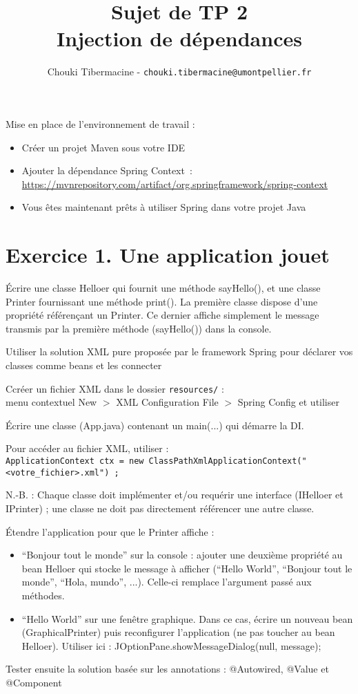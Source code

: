 \documentclass[11pt]{article}
\title{Sujet de TP 2\\
{\large Injection de dépendances}}
\author{Chouki Tibermacine - \texttt{chouki.tibermacine@umontpellier.fr}}
\date{}
\begin{document}
\maketitle

Mise en place de l'environnement de travail :

\begin{itemize}
  \item Créer un projet Maven sous votre IDE 
  \item Ajouter la dépendance Spring Context~:\\
  \url{https://mvnrepository.com/artifact/org.springframework/spring-context}
  \item Vous êtes maintenant prêts à utiliser Spring dans votre projet
    Java
\end{itemize}

\section*{Exercice 1. \small{Une application jouet}} 

Écrire une classe Helloer qui fournit une méthode sayHello(), et une
classe Printer fournissant une méthode print(). La première classe
dispose d'une propriété référençant un Printer. Ce dernier affiche
simplement le message transmis par la première méthode (sayHello())
dans la console.

Utiliser la solution XML pure proposée par le framework Spring pour
déclarer vos classes comme beans et les connecter

Ccréer un fichier XML dans le dossier \texttt{resources/} :\\
menu contextuel New $>$ XML Configuration File $>$ Spring Config et utiliser

Écrire une classe (App.java) contenant un main(...) qui démarre la DI.

Pour accéder au fichier XML, utiliser :\\
\texttt{ApplicationContext ctx = new ClassPathXmlApplicationContext("<votre\_fichier>.xml") ;}

N.-B. : Chaque classe doit implémenter et/ou requérir une interface
(IHelloer et IPrinter) ; une classe ne doit pas directement référencer
une autre classe.

Étendre l'application pour que le Printer affiche :
\begin{itemize}
\item ``Bonjour tout le monde'' sur la console : ajouter une deuxième
  propriété au bean Helloer qui stocke le message à afficher (``Hello
  World'', ``Bonjour tout le monde'', ``Hola, mundo'', ...). Celle-ci
  remplace l'argument passé aux méthodes.
\item ``Hello World'' sur une fenêtre graphique. Dans ce cas, écrire
  un nouveau bean (GraphicalPrinter) puis reconfigurer l'application
  (ne pas toucher au bean Helloer).  Utiliser ici :
  JOptionPane.showMessageDialog(null, message);
\end{itemize}
Tester ensuite la solution basée sur les annotations : @Autowired,
@Value et @Component
\end{document}
